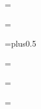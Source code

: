 \headline={\ifblank\hfil\else\iftitle\hfil\else
  \ifodd\pageno\rightheadline\else\leftheadline\fi\fi\fi}

\footline={\ifblank
    \hfil
  \else\iftitle
    \ifodd\pageno\rightnumfoot\else\leftnumfoot\fi
  \else
    \rcstag\hfil
  \fi\fi}

\def\leftheadline{\tenit\thepageno\quad\lhead\hfill}
\def\rightheadline{\hfill\tenit\rhead\quad\thepageno}

\def\leftnumfoot{\tenit\thepageno\hfil\rcstag}
\def\rightnumfoot{\rcstag\hfil\tenit\thepageno}

\def\lhead{} %
\def\rhead{\firstmark} %

\def\thepageno{\folio}


%
%

\skip\footins=\grid plus0.5\grid
\dimen{}\grid
\count{}

\def\footnote{\fnmark\fntext}

\def\fnmark{\edef\@sf{\spacefactor\the\spacefactor}%
  \global\advance\footcnt by1
  \hyperanchor@\fntag{fn}%
  \hyperlink{\fntag a}{$^{\number\footcnt}$}\@sf}

\def\fntext{\insert\footins\bgroup\eightpoint
  \interlinepenalty=\interfootnotelinepenalty
  \let\par=\endgraf
  \leftskip=0pt \rightskip=0pt
  \splittopskip=\ht\strutbox %
  \splitmaxdepth=\dp\strutbox \floatingpenalty=20000
  \noindent 
  \hyperanchor{\fntag a}\hyperlink\fntag{$^{\number\footcnt}$}\enspace
  \bgroup\strut
  \aftergroup\@foot\let\next}
\def\@foot{\strut\egroup}


%
% 

\newinsert\margin
\dimen\margin=\maxdimen \count{} \skip\margin=0pt

\newbox\preambox \setbox\preambox=\vbox{}
\def\preamble#1{\global\setbox\preambox=\vbox{\unvbox\preambox#1}}
\def\dopreamble{\unvbox\preambox \global\let\dopreamble=\relax}

\output={
  \outputpage\pagebody \resetpage}

